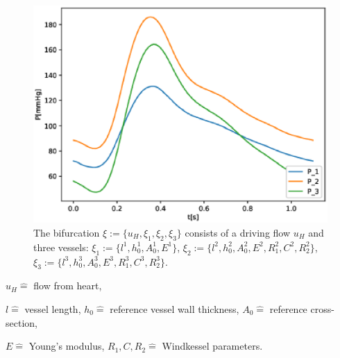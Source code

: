 \documentclass[compress]{beamer}
\begin{document}
\begin{frame}
\begin{figure}
\begin{center}
\begin{minipage}[t][0.35\paperheight][t]{\textwidth}
\begin{minipage}{0.44\textwidth}
					\includegraphics[width=\textwidth]{images/compare_output_params_P_P.eps}
				\end{minipage}
			\end{minipage}
			\begin{minipage}[t][0.34\paperheight][t]{\textwidth}
				\begin{minipage}{0.44\textwidth}
					\caption*{The bifurcation $\xi := \{u_H, \xi_1, \xi_2, \xi_3\}$ consists of a driving flow $u_H$ and three vessels: $\xi_1 := \{l^1, h_0^1, A_0^1, E^1\}$, $\xi_2 := \{l^2, h_0^2, A_0^2, E^2, R_1^2, C^2, R_2^2\}$, $\xi_3 := \{l^3, h_0^3, A_0^3, E^3, R_1^3, C^3, R_2^3\}.$}
				\end{minipage}
				\hfill
				\begin{minipage}{0.44\textwidth}
				\end{minipage}
			\end{minipage}
		\end{center}
	\end{figure}
	\begin{minipage}[t][0.1\paperheight][t]{\textwidth}
		{\tiny \centering 
			$u_H \hat{=}$ flow from heart,

			$l \hat{=}$ vessel length,
			$h_0 \hat{=}$ reference vessel wall thickness,
			$A_0 \hat{=}$ reference cross-section,

			$E \hat{=}$ Young's modulus,
			$R_1, C, R_2 \hat{=}$ Windkessel parameters.
		\par}
	\end{minipage}
\end{frame}
\end{document}
